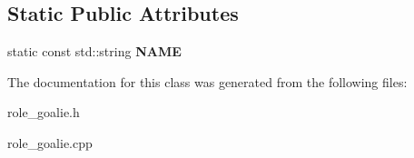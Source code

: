 \subsection*{Static Public Attributes}
\begin{DoxyCompactItemize}
\item 
\hypertarget{classRoleGoalie_ad21fff9451d0cd670b36ca1b39c136a1}{
static const std::string {\bfseries NAME}}
\label{classRoleGoalie_ad21fff9451d0cd670b36ca1b39c136a1}

\end{DoxyCompactItemize}


The documentation for this class was generated from the following files:\begin{DoxyCompactItemize}
\item 
role\_\-goalie.h\item 
role\_\-goalie.cpp\end{DoxyCompactItemize}
